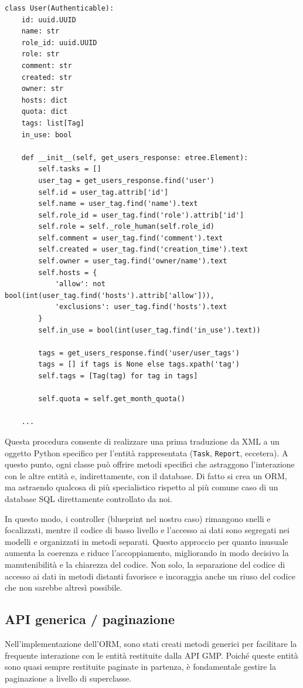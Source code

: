 \begin{lstlisting}[caption={Destrutturazione dal documento XML a Python}]
class User(Authenticable):
    id: uuid.UUID
    name: str
    role_id: uuid.UUID
    role: str
    comment: str
    created: str
    owner: str
    hosts: dict
    quota: dict
    tags: list[Tag]
    in_use: bool

    def __init__(self, get_users_response: etree.Element):
        self.tasks = []
        user_tag = get_users_response.find('user')
        self.id = user_tag.attrib['id']
        self.name = user_tag.find('name').text
        self.role_id = user_tag.find('role').attrib['id']
        self.role = self._role_human(self.role_id)
        self.comment = user_tag.find('comment').text
        self.created = user_tag.find('creation_time').text
        self.owner = user_tag.find('owner/name').text
        self.hosts = {
            'allow': not bool(int(user_tag.find('hosts').attrib['allow'])),
            'exclusions': user_tag.find('hosts').text
        }
        self.in_use = bool(int(user_tag.find('in_use').text))

        tags = get_users_response.find('user/user_tags')
        tags = [] if tags is None else tags.xpath('tag')
        self.tags = [Tag(tag) for tag in tags]

        self.quota = self.get_month_quota()
    
    ...
\end{lstlisting}

Questa procedura consente di realizzare una prima traduzione da XML a un oggetto Python specifico per l'entità rappresentata (\texttt{Task}, \texttt{Report}, eccetera). A questo punto, ogni classe può offrire metodi specifici che astraggono l'interazione con le altre entità e, indirettamente, con il database. Di fatto si crea un ORM, ma astraendo qualcosa di più specialistico rispetto al più comune caso di un database SQL direttamente controllato da noi.

In questo modo, i controller (blueprint nel nostro caso) rimangono snelli e focalizzati, mentre il codice di basso livello e l'accesso ai dati sono segregati nei modelli e organizzati in metodi separati. Questo approccio per quanto inusuale aumenta la coerenza e riduce l'accoppiamento, migliorando in modo decisivo la manutenibilità e la chiarezza del codice. Non solo, la separazione del codice di accesso ai dati in metodi distanti favorisce e incoraggia anche un riuso del codice che non sarebbe altresì possibile.

\subsection{API generica / paginazione}
Nell'implementazione dell'ORM, sono stati creati metodi generici per facilitare la frequente interazione con le entità restituite dalla API GMP. Poiché queste entità sono quasi sempre restituite paginate in partenza, è fondamentale gestire la paginazione a livello di superclasse.

